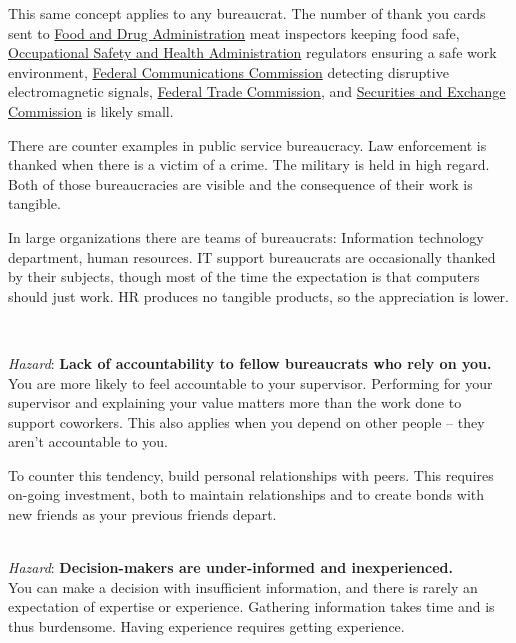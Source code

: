 This same concept applies to any bureaucrat. The number of thank you cards sent to \href{https://www.fda.gov/}{Food and Drug Administration} meat inspectors keeping food safe, \href{https://www.osha.gov/}{Occupational Safety and Health Administration} regulators ensuring a safe work environment, \href{https://www.fcc.gov/}{Federal Communications Commission} detecting disruptive electromagnetic signals, \href{https://www.ftc.gov/}{Federal Trade Commission}, and \href{https://www.sec.gov/}{Securities and Exchange Commission} is likely small. 

There are counter examples in public service bureaucracy. 
Law enforcement is thanked when there is a victim of a crime. The military is held in high regard. Both of those bureaucracies are visible and the consequence of their work is tangible. 

In large organizations there are teams of bureaucrats: Information technology department, human resources. IT support bureaucrats are occasionally thanked by their subjects, though most of the time the expectation is that computers should just work. HR produces no tangible products, so the appreciation is lower.


\ \\

\begin{samepage}
\textit{Hazard}: \textbf{Lack of accountability to fellow bureaucrats who rely on you.}\\
You are more likely to feel accountable to your supervisor. Performing for your supervisor and explaining your value matters more than the work done to support coworkers.  This also applies when you depend on other people -- they aren't accountable to you.

To counter this tendency, build personal relationships with peers. This requires on-going investment, both to maintain relationships and to create bonds with new friends as your previous friends depart.
\end{samepage}

\ \\

\textit{Hazard}: \textbf{Decision-makers are under-informed and inexperienced.}\\
You can make a decision with insufficient information, and there is rarely an expectation of expertise or experience. 
Gathering information takes time and is thus burdensome.
Having experience requires getting experience.

